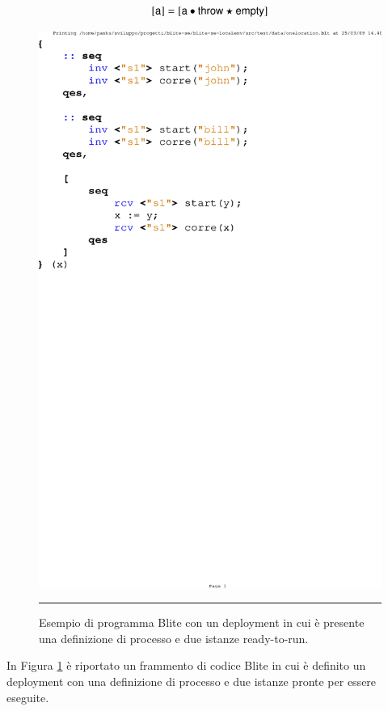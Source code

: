 $$
{\sf [a]} = [{\sf a} \bullet {\sf throw} \star {\sf empty}]
$$

\begin{figure}[!t]
\begin{center}
  \includegraphics[scale=0.80,clip]{linguaggio/dia/blt2}
   \caption[Codice Blite, esempio ready-to-run instance]{Esempio di programma
   Blite con un deployment in cui è presente una definizione di processo e due
   istanze ready-to-run.}
   \rule{7cm}{0.01cm}
  \label{fig:lin:blt2}
\end{center}
\end{figure}

In Figura \ref{fig:lin:blt2} è riportato un frammento di codice Blite in cui è
definito un deployment con una definizione di processo e due istanze pronte per
essere eseguite.

